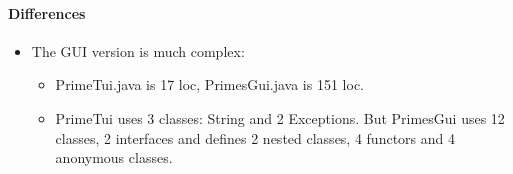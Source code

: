 \documentclass[a4paper, 9pt]{extarticle}
\begin{document}
\paragraph{Differences}

\begin{itemize}

  \item The GUI version is much complex:

    \begin{itemize}

      \item PrimeTui.java is 17 loc, PrimesGui.java is 151 loc.

      \item PrimeTui uses 3 classes: String and 2 Exceptions. But PrimesGui
        uses 12 classes, 2 interfaces and defines 2 nested classes, 4 functors
        and 4 anonymous classes.

    \end{itemize}

\end{itemize}
\end{document}
